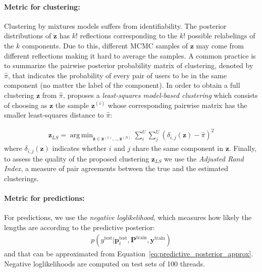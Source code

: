 \documentclass[smallextended]{svjour3}          %
\DeclareMathOperator*{\argmin}{arg\,min}
\begin{document}
\paragraph{Metric for clustering:}
Clustering by mixtures models suffers from identifiability. The posterior distributions of $\mathbf{z}$ has $k!$ reflections corresponding to the $k!$ possible relabelings of the $k$ components. Due to this, different MCMC samples of $\mathbf{z}$ may come from different reflections making it hard to average the samples. A common practice is to summarize the pairwise posterior probability matrix of clustering, denoted by $\hat{\pi}$, that indicates the probability of every pair of users to be in the same component (no matter the label of the component). In order to obtain a full clustering $\mathbf{z}$ from $\hat{\pi}$, \cite{Dahl2006} proposes a \textit{least-squares model-based clustering} which consists of choosing as $\mathbf{z}$ the sample $\mathbf{z}^{(i)}$ whose corresponding pairwise matrix has the smaller least-squares distance to $\hat{\pi}$:

\begin{align}
\mathbf{z}_{LS} = \argmin_{\mathbf{z} \in \mathbf{z}^{(1)},..,\mathbf{z}^{(N)}} \sum_i^U \sum_j^U (\delta_{i,j}(\mathbf{z}) - \hat{\pi})^2
\end{align}
where $\delta_{i,j}(\mathbf{z})$ indicates whether $i$ and $j$ share the same component in $\mathbf{z}$.
Finally, to assess the quality of the proposed clustering $\mathbf{z}_{LS}$ we use the \textit{Adjusted Rand Index}, a measure of pair agreements between the true and the estimated clusterings.

\paragraph{Metric for predictions:}
For predictions, we use the \textit{negative loglikelihood}, 
which measures how likely the lengths are according to the predictive posterior:
\begin{align}
p(y^{\text{test}} | \mathbf{p}_t^{\text{test}}, \mathbf{P}^{\text{train}}, \mathbf{y}^{\text{train}})
\end{align}
and that can be approximated from Equation~\ref{eq:predictive_posterior_approx}. Negative loglikelihoods are computed on test sets of 100 threads.


\end{document}
